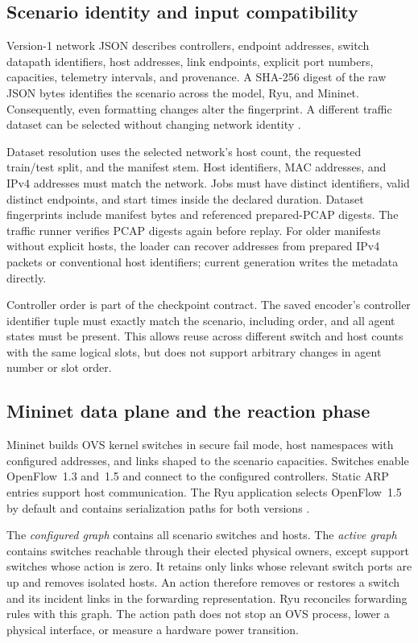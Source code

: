 \documentclass[11pt,a4paper]{article}
\newcommand{\code}[1]{\texttt{\detokenize{#1}}}
\begin{document}
\subsection{Scenario identity and input compatibility}

Version-1 network JSON describes controllers, endpoint addresses, switch
datapath identifiers, host addresses, link endpoints, explicit port numbers,
capacities, telemetry intervals, and provenance. A SHA-256 digest of the raw
JSON bytes identifies the scenario across the model, Ryu, and Mininet.
Consequently, even formatting changes alter the fingerprint. A different
traffic dataset can be selected without changing network identity
\cite{code-env,code-datasets,code-routing}.

Dataset resolution uses the selected network's host count, the requested
train/test split, and the manifest stem. Host identifiers, MAC addresses, and
IPv4 addresses must match the network. Jobs must have distinct identifiers,
valid distinct endpoints, and start times inside the declared duration.
Dataset fingerprints include manifest bytes and referenced prepared-PCAP
digests. The traffic runner verifies PCAP digests again before replay. For
older manifests without explicit hosts, the loader can recover addresses from
prepared IPv4 packets or conventional host identifiers; current generation
writes the metadata directly.

Controller order is part of the checkpoint contract. The saved encoder's
controller identifier tuple must exactly match the scenario, including order,
and all agent states must be present. This allows reuse across different switch
and host counts with the same logical slots, but does not support arbitrary
changes in agent number or slot order.

\subsection{Mininet data plane and the reaction phase}
\label{sec:forwarding}

Mininet builds OVS kernel switches in secure fail mode, host namespaces with
configured addresses, and \code{TCLink} links shaped to the scenario capacities.
Switches enable OpenFlow~1.3 and~1.5 and connect to the configured controllers.
Static ARP entries support host communication. The Ryu application selects
OpenFlow~1.5 by default and contains serialization paths for both versions
\cite{code-runtime,code-routing}.

The \emph{configured graph} contains all scenario switches and hosts. The
\emph{active graph} contains switches reachable through their elected physical
owners, except support switches whose action is zero. It retains only links
whose relevant switch ports are up and removes isolated hosts. An action
therefore removes or restores a switch and its incident links in the forwarding
representation. Ryu reconciles forwarding rules with this graph. The action
path does not stop an OVS process, lower a physical interface, or measure a
hardware power transition.
\end{document}
